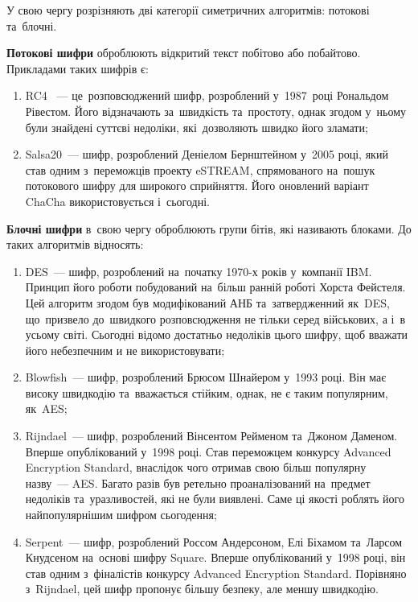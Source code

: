\documentclass[a4paper,oneside,titlepage,14pt]{extarticle}
\begin{document}
			У свою чергу розрізняють дві категорії симетричних алгоритмів: потокові та~блочні. \par
			
			\textbf{Потокові шифри} оброблюють відкритий текст побітово або побайтово. Прикладами таких шифрів є:
				\begin{enumerate}[label=\alph*)]
					\item RC4 ~--- це~розповсюджений шифр, розроблений у~1987~році Рональдом Рівестом. Його відзначають за~швидкість та~простоту, однак згодом у~ньому були знайдені суттєві недоліки, які~дозволяють швидко його зламати;
					\item Salsa20~--- шифр, розроблений Деніелом Бернштейном у~2005 році, який став одним з~переможців проекту eSTREAM, спрямованого на~пошук потокового шифру для широкого сприйняття. Його оновлений варіант ChaCha використовується і~сьогодні.
				\end{enumerate}
			\par
			
			\textbf{Блочні шифри} в~свою чергу оброблюють групи бітів, які називають блоками. До таких алгоритмів відносять:
				\begin{enumerate}
					\item DES~--- шифр, розроблений на~початку 1970-х років у~компанії IBM. Принцип його роботи побудований на~більш ранній роботі Хорста Фейстеля. Цей алгоритм згодом був модифікований АНБ та~затвердженний як~DES, що~призвело до~швидкого розповсюдження не тільки серед військових, а і~в усьому світі. Сьогодні відомо достатньо недоліків цього шифру, щоб вважати його небезпечним и не використовувати;
					\item Blowfish~--- шифр, розроблений Брюсом Шнайером у~1993 році. Він має високу швидкодію та~вважається стійким, однак, не є таким популярним, як~AES;
					\item Rijndael~--- шифр, розроблений Вінсентом Рейменом та~Джоном Даменом. Вперше опублікований у~1998 році. Став переможцем конкурсу Advanced Encryption Standard, внаслідок чого отримав свою більш популярну назву~--- AES. Багато разів був ретельно проаналізований на~предмет недоліків та~уразливостей, які не були виявлені. Саме ці якості роблять його найпопулярнішим шифром сьогодення;
					\item Serpent~--- шифр, розроблений Россом Андерсоном, Елі Біхамом та~Ларсом Кнудсеном на~основі шифру Square. Вперше опублікований у~1998 році, він став одним з~фіналістів конкурсу Ad\-van\-ced En\-cryp\-tion Standard. Порівняно з~Rijndael, цей шифр пропонує більшу безпеку, але меншу швидкодію.
				\end{enumerate}
			\par
			
\end{document}
